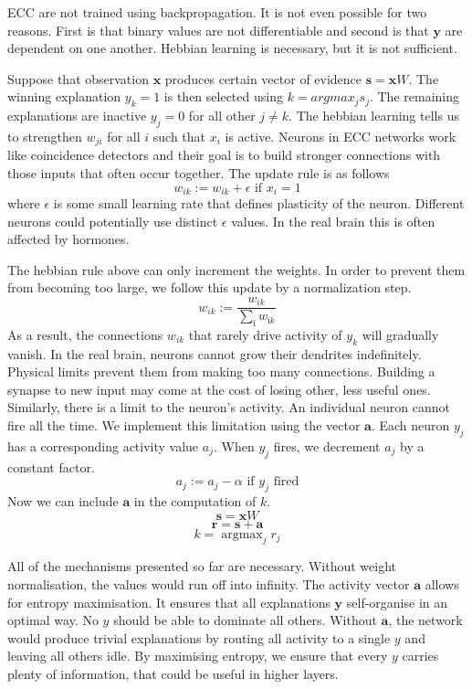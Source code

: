 \documentclass[12pt]{article}
\DeclareMathOperator*{\argmax}{argmax}
\begin{document}
ECC are not trained using backpropagation. It is not even possible for two reasons. First is that binary values are not differentiable and second is that $\boldsymbol{y}$ are dependent on one another. Hebbian learning is necessary, but it is not sufficient. 

Suppose that observation $\boldsymbol{x}$ produces certain vector of evidence $\boldsymbol{s}=\boldsymbol{x}W$. The winning explanation $y_k=1$ is then selected using $k=argmax_j s_j$. The remaining explanations are inactive $y_j=0$ for all other $j\ne k$.
The hebbian learning tells us to strengthen $w_{ji}$ for all $i$ such that $x_i$ is active. Neurons in ECC networks work like coincidence detectors and their goal is to build stronger connections with those inputs that often occur together. The update rule is as follows
\[
w_{ik} := w_{ik} + \epsilon \text{ if } x_i=1
\]
where $\epsilon$ is some small learning rate that defines plasticity of the neuron. Different neurons could potentially use distinct $\epsilon$ values. In the real brain this is often affected by hormones. 

The hebbian rule above can only increment the weights. In order to prevent them from becoming too large, we follow this update by a normalization step.
\[
w_{ik} := \frac{w_{ik}}{ \sum_{ï} w_{ïk}} 
\]
As a result, the connections $w_{ik}$ that rarely drive activity of $y_k$ will gradually vanish. In the real brain, neurons cannot grow their dendrites indefinitely. Physical limits prevent them from making too many connections. Building a synapse to new input may come at the cost of losing other, less useful ones. Similarly, there is a limit to the neuron's activity. An individual neuron cannot fire all the time. We implement this limitation using the vector $\boldsymbol{a}$. Each neuron $y_j$ has a corresponding activity value $a_j$.
When $y_j$ fires, we decrement $a_j$ by a constant factor.
\[
a_j := a_j - \alpha \text{ if } y_j \text{ fired}
\]
Now we can include $\boldsymbol{a}$ in the computation of $k$.
\[\boldsymbol{s} = \boldsymbol{x}W \]
\[\boldsymbol{r} = \boldsymbol{s} + \boldsymbol{a} \]
\[k = \argmax_j r_j \]

All of the mechanisms presented so far are necessary. Without weight normalisation, the values would run off into infinity. The activity vector $\boldsymbol{a}$ allows for entropy maximisation. It ensures that all explanations
$\boldsymbol{y}$ self-organise in an optimal way. No $y$ should be able to dominate all others. Without $\boldsymbol{a}$, the network would produce trivial explanations by routing all activity to a single $y$ and leaving all others idle. By maximising entropy, we ensure that every $y$ carries plenty of information, that could be useful in higher layers.
\end{document}
